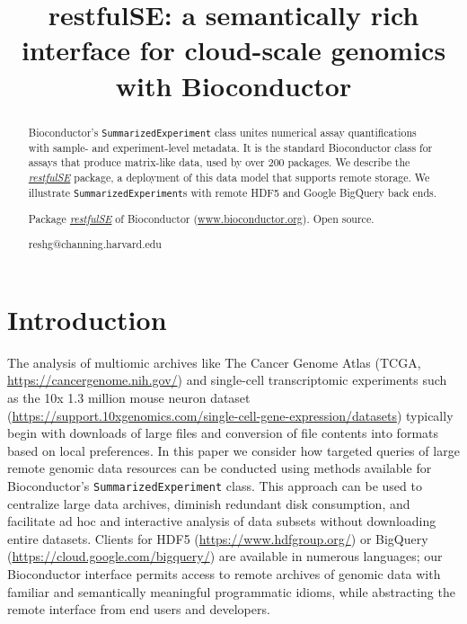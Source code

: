 \documentclass[applications]{gen-bioinformatics}
\author[1]{\pfnm{Shweta}
  \pinit{}
  \psnm{Gopaulakrishnan}}
\author[1]{\pfnm{Samuela}
  \pinit{}
  \psnm{Pollack}}
\author[1]{\pfnm{Benjamin}
  \pinit{}
  \psnm{Stubbs}}
\author[2]{\pfnm{Herv\'e}
  \pinit{}
  \psnm{Pag\`es}}
\author[3]{\pfnm{John}
  \pinit{}
  \psnm{Readey}}
\author[4]{\pfnm{Sean}
  \pinit{}
  \psnm{Davis}}
\author[5]{\pfnm{Levi}
  \pinit{}
  \psnm{Waldron}}
\author[6]{\pfnm{Martin}
  \pinit{T}
  \psnm{Morgan}}
\author[1]{\pfnm{Vincent}
  \pinit{J}
  \psnm{Carey}}
\newcommand{\Biocpackage}[1]{{\emph{\href{https://bioconductor.org/packages/3.8/#1}{#1}}}}
\begin{document}
\title{restfulSE: a semantically rich interface for cloud-scale genomics
with Bioconductor}
\maketitle

\begin{abstract}
\begin{subabstract}[Summary]
Bioconductor's \texttt{SummarizedExperiment} class unites numerical
assay quantifications with sample- and experiment-level metadata.  
It is the standard Bioconductor class for assays that
produce matrix-like data, used by over 200 packages.
We describe the \Biocpackage{restfulSE} package, a deployment of 
this data model that supports
remote storage.
We illustrate
\texttt{SummarizedExperiment}s with remote HDF5 and Google
BigQuery back ends.
\end{subabstract}
\begin{subabstract}[Availability] Package \Biocpackage{restfulSE} of Bioconductor
 (\url {www.bioconductor.org}). Open source.
\end{subabstract}
\begin{subabstract}[Contact]reshg@channing.harvard.edu
\end{subabstract}
\end{abstract}
\section*{Introduction}

The analysis of multiomic archives like The Cancer Genome Atlas (TCGA, \url{https://cancergenome.nih.gov/})
and single-cell transcriptomic experiments such as the 10x 1.3 million
mouse neuron dataset (\url{https://support.10xgenomics.com/single-cell-gene-expression/datasets}) typically begin with downloads of large files and
conversion of file contents into formats based on local preferences.
In this paper we consider how targeted queries of large remote genomic
data resources can be conducted using methods available for
Bioconductor's \texttt{SummarizedExperiment} class.  This approach can
be used to centralize large data archives, diminish redundant disk
consumption, and facilitate ad hoc and interactive analysis of data
subsets without downloading entire datasets. Clients for
HDF5 (\url{https://www.hdfgroup.org/}) or BigQuery (\url{https://cloud.google.com/bigquery/}) are available in numerous languages; our
Bioconductor interface permits access to remote archives of genomic
data with familiar and semantically meaningful programmatic idioms,
while abstracting the remote interface from end users
and developers.
\end{document}
